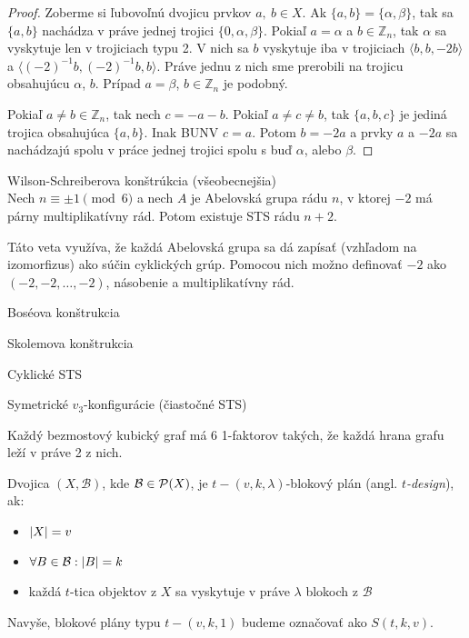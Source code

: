 \begin{proof}
	Zoberme si ľubovoľnú dvojicu prvkov $a,\ b \in X$. Ak $\{ a, b \} = \{ \alpha, \beta \}$, tak sa $\{a, b\}$ nachádza v práve jednej trojici $\{0, \alpha, \beta \}$. Pokiaľ $a = \alpha$ a $b \in \mathbb{Z}_n$, tak $\alpha$ sa vyskytuje len v trojiciach typu 2. V nich sa $b$ vyskytuje iba v trojiciach $\langle b, b, -2b \rangle$ a $\langle (-2)^{-1}b, (-2)^{-1}b, b \rangle$. Práve jednu z nich sme prerobili na trojicu obsahujúcu $\alpha$, $b$. Prípad $a = \beta$, $b \in \mathbb{Z}_n$ je podobný.
	
	Pokiaľ $a \ne b \in \mathbb{Z}_n$, tak nech $c = - a - b$. Pokiaľ $a \ne c \ne b$, tak $\{a, b, c\}$ je jediná trojica obsahujúca $\{a, b\}$. Inak BUNV $c = a$. Potom $b = -2a$ a prvky $a$ a $-2a$ sa nachádzajú spolu v práce jednej trojici spolu s buď $\alpha$, alebo $\beta$.
\end{proof}

\begin{theorem_hard}{Wilson-Schreiberova konštrúkcia (všeobecnejšia)}\\
	Nech $n \equiv \pm 1 \pmod{6}$ a nech $A$ je Abelovská grupa rádu $n$, v ktorej $-2$ má párny multiplikatívny rád. Potom existuje STS rádu $n + 2$. 
\end{theorem_hard}

Táto veta využíva, že každá Abelovská grupa sa dá zapísať (vzhľadom na izomorfizus) ako súčin cyklických grúp. Pomocou nich možno definovať $-2$ ako $(-2,-2, \dots, -2)$, násobenie a multiplikatívny rád.

\TODO Boséova konštrukcia

\TODO Skolemova konštrukcia

\TODO Cyklické STS

\TODO Symetrické $v_3$-konfigurácie (čiastočné STS)

\begin{hypothesis}
Každý bezmostový kubický graf má 6 1-faktorov takých, že každá hrana grafu leží v práve 2 z nich.
\end{hypothesis}


\begin{definition}
Dvojica $(X, \mathcal{B})$, kde $\mathcal{B} \in \mathcal{P}(X)$, je $t-(v, k, \lambda)$-blokový plán (angl. \emph{$t$-design}), ak:
\begin{itemize}
    \item $\left|X\right| = v$
    \item $\forall B \in \mathcal{B}: \left|B\right| = k$
    \item každá $t$-tica objektov z $X$ sa vyskytuje v práve $\lambda$ blokoch z $\mathcal{B}$
\end{itemize}

Navyše, blokové plány typu $t-(v,k,1)$ budeme označovať ako $S(t,k,v)$.
\end{definition}

